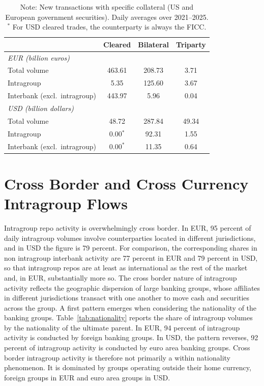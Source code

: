 \documentclass[english, 11pt, oneside, legal]{article}
\begin{document}
\begin{table}[t]
\centering
\caption{Daily average repo volumes by clearing type and currency}
\label{tab:market_structure}
\begin{tabular}{lccc}
\hline
& Cleared & Bilateral & Triparty \\
\hline
\multicolumn{4}{l}{\textit{EUR (billion euros)}} \\
Total volume                       & 463.61 & 208.73 & 3.71 \\
Intragroup                         &   5.35 & 125.60 & 3.67 \\
Interbank (excl.\ intragroup)      & 443.97 &   5.96 & 0.04 \\
\hline
\multicolumn{4}{l}{\textit{USD (billion dollars)}} \\
Total volume                       &  48.72 & 287.84 & 49.34 \\
Intragroup                         &   0.00$^{*}$ &  92.31 & 1.55 \\
Interbank (excl.\ intragroup)      &   0.00$^{*}$ &  11.35 & 0.64 \\
\hline
\end{tabular}
\caption*{\footnotesize Note: New transactions with specific collateral (US and European government securities). Daily averages over 2021--2025. $^{*}$ For USD cleared trades, the counterparty is always the FICC.}
\end{table}


\section{Cross Border and Cross Currency Intragroup Flows}
\label{sec:descriptives}

Intragroup repo activity is overwhelmingly cross border. In EUR, 95 percent of daily intragroup volumes involve counterparties located in different jurisdictions, and in USD the figure is 79 percent. For comparison, the corresponding shares in non intragroup interbank activity are 77 percent in EUR and 79 percent in USD, so that intragroup repos are at least as international as the rest of the market and, in EUR, substantially more so. The cross border nature of intragroup activity reflects the geographic dispersion of large banking groups, whose affiliates in different jurisdictions transact with one another to move cash and securities across the group. A first pattern emerges when considering the nationality of the banking groups. Table~\ref{tab:nationality} reports the share of intragroup volumes by the nationality of the ultimate parent. In EUR, 94 percent of intragroup activity is conducted by foreign banking groups. In USD, the pattern reverses, 92 percent of intragroup activity is conducted by euro area banking groups. Cross border intragroup activity is therefore not primarily a within nationality phenomenon. It is dominated by groups operating outside their home currency, foreign groups in EUR and euro area groups in USD.
\end{document}
